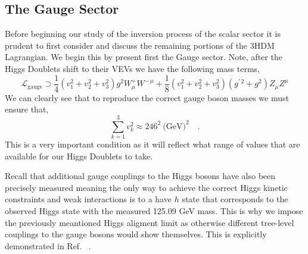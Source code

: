 % 
%

\subsection{The Gauge Sector}

Before beginning our study of the inversion process of the scalar sector it is prudent to first consider and discuss the remaining portions of the 3HDM Lagrangian. 
%
We begin this by present first the Gauge sector. 
%
Note, after the Higgs Doublets shift to their VEVs we have the following mass terms, 
%
\begin{equation}
\mathcal{L}_{\text{gauge}} \supset \frac{1}{4} \left( v_1^2 + v_2^2  + v_3^2 \right) g^2 W^+_\mu W^{-\,\mu} + \frac{1}{8} \left(  v_1^2 + v_2^2  + v_3^2  \right) \left( g^{\prime \, 2} + g^2 \right) Z_\mu Z^\mu  
\end{equation}
%
We can clearly see that to reproduce the correct gauge boson masses we must ensure that,
%
\begin{equation}
\label{eq:VEV_Condition}
\sum_{k=1}^3 v_k^2 \approx 246^2 \ \text{(GeV)}^2 \quad . 
\end{equation}
%
This is a very important condition as it will reflect what range of values that are available for our Higgs Doublets to take.

Recall that additional gauge couplings to the Higgs bosons have also been precisely measured meaning the only way to achieve the correct Higgs kinetic constraints and weak interactions is to a have $h$ state that corresponds to the observed Higgs state with the measured 125.09 GeV mass. 
%
This is why we impose the previously meantioned Higgs aligment limit as otherwise different tree-level couplings to the gauge bosons would show themselves. 
%
This is explicitly demonstrated in Ref.~\cite{das2015implications} . 

